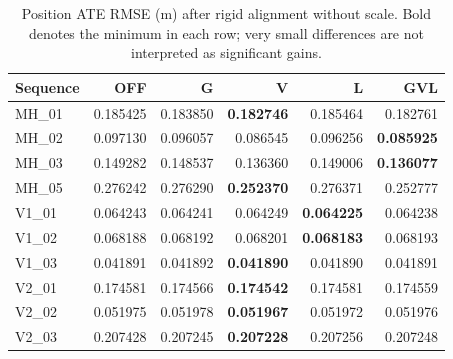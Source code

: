 \begin{table}[t]
\caption{Position ATE RMSE (m) after rigid alignment without scale. Bold denotes the minimum in each row; very small differences are not interpreted as significant gains.}\label{tab:ate}
\centering\small
\begin{tabular}{lrrrrr}
\toprule
Sequence & OFF & G & V & L & GVL \\
\midrule
MH\_01 & 0.185425 & 0.183850 & \textbf{0.182746} & 0.185464 & 0.182761 \\
MH\_02 & 0.097130 & 0.096057 & 0.086545 & 0.096256 & \textbf{0.085925} \\
MH\_03 & 0.149282 & 0.148537 & 0.136360 & 0.149006 & \textbf{0.136077} \\
MH\_05 & 0.276242 & 0.276290 & \textbf{0.252370} & 0.276371 & 0.252777 \\
V1\_01 & 0.064243 & 0.064241 & 0.064249 & \textbf{0.064225} & 0.064238 \\
V1\_02 & 0.068188 & 0.068192 & 0.068201 & \textbf{0.068183} & 0.068193 \\
V1\_03 & 0.041891 & 0.041892 & \textbf{0.041890} & 0.041890 & 0.041891 \\
V2\_01 & 0.174581 & 0.174566 & \textbf{0.174542} & 0.174581 & 0.174559 \\
V2\_02 & 0.051975 & 0.051978 & \textbf{0.051967} & 0.051972 & 0.051976 \\
V2\_03 & 0.207428 & 0.207245 & \textbf{0.207228} & 0.207256 & 0.207248 \\
\bottomrule
\end{tabular}
\end{table}
